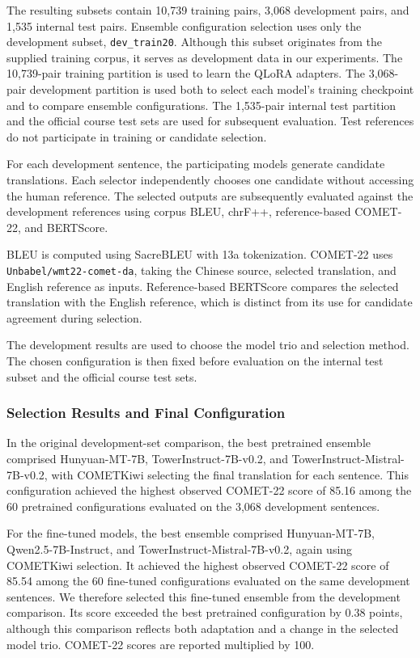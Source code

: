 \documentclass[11pt]{article}
\begin{document}
The resulting subsets contain 10,739 training pairs, 3,068 development pairs, and 1,535 internal test pairs. Ensemble configuration selection uses only the development subset, \texttt{dev\_train20}. Although this subset originates from the supplied training corpus, it serves as development data in our experiments. The 10,739-pair training partition is used to learn the QLoRA adapters. The 3,068-pair development partition is used both to select each model's training checkpoint
and to compare ensemble configurations. The 1,535-pair internal test partition and the official course test sets are used for subsequent evaluation. Test references do not participate in training or candidate selection.

For each development sentence, the participating models generate candidate translations. Each selector independently chooses one candidate without accessing the human reference. The selected outputs are subsequently evaluated against the development references using corpus BLEU, chrF++, reference-based COMET-22, and BERTScore.

BLEU is computed using SacreBLEU with 13a tokenization. COMET-22 uses \texttt{Unbabel/wmt22-comet-da}, taking the Chinese source, selected translation, and English reference as inputs. Reference-based BERTScore compares the selected translation with the English reference, which is distinct from its use for candidate agreement during selection.

The development results are used to choose the model trio and selection method. The chosen configuration is then fixed before evaluation on the internal test subset and the official course test sets.

\subsubsection{Selection Results and Final Configuration}
\label{subsubsec:final_ensemble}
In the original development-set comparison, the best pretrained ensemble comprised Hunyuan-MT-7B, TowerInstruct-7B-v0.2, and TowerInstruct-Mistral-7B-v0.2, with COMETKiwi selecting the final translation for each sentence. This configuration achieved the highest observed COMET-22 score of 85.16 among the 60 pretrained configurations evaluated on the 3,068 development sentences.

For the fine-tuned models, the best ensemble comprised Hunyuan-MT-7B, Qwen2.5-7B-Instruct, and TowerInstruct-Mistral-7B-v0.2, again using COMETKiwi selection. It achieved the highest observed COMET-22 score of 85.54 among the 60 fine-tuned configurations evaluated on the same development sentences. We therefore selected this fine-tuned ensemble from the development comparison. Its score exceeded the best pretrained configuration by 0.38 points, although this comparison reflects both adaptation and a change in the selected model trio. COMET-22 scores are reported multiplied by 100.
\end{document}
